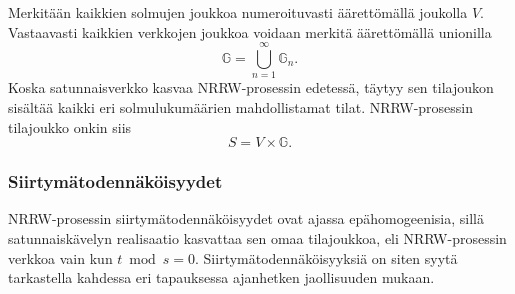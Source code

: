 \documentclass[finnish, 12pt, a4paper, sci, utf8, pdfa]{aaltothesis}
\begin{document}
Merkitään kaikkien solmujen joukkoa numeroituvasti äärettömällä joukolla $ V $. Vastaavasti kaikkien verkkojen joukkoa voidaan merkitä äärettömällä unionilla
\begin{equation}
   \mathbb{G} = \bigcup_{n = 1}^{\infty} \mathbb{G}_{n}.
\end{equation}
Koska satunnaisverkko kasvaa NRRW-prosessin edetessä, täytyy sen tilajoukon sisältää kaikki eri solmulukumäärien mahdollistamat tilat. NRRW-prosessin tilajoukko onkin siis
\begin{equation}
   S = V \times \mathbb{G}.
   \label{equation:tilajoukko}
\end{equation}

\subsubsection{Siirtymätodennäköisyydet}

NRRW-prosessin siirtymätodennäköisyydet ovat ajassa epähomogeenisia, sillä satunnaiskävelyn realisaatio kasvattaa sen omaa tilajoukkoa, eli NRRW-prosessin verkkoa vain kun $ t \bmod s = 0 $. Siirtymätodennäköisyyksiä on siten syytä tarkastella kahdessa eri tapauksessa ajanhetken jaollisuuden mukaan. 
\end{document}
